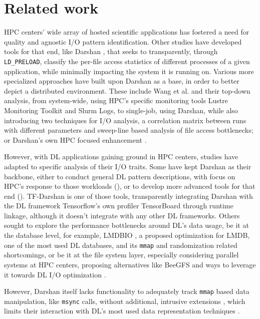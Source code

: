 \documentclass[conference]{IEEEtran}
\begin{document}
\section{Related work}


HPC centers' wide array of hosted scientific applications has fostered a need for quality and agnostic I/O pattern identification. Other studies have developed tools for that end, like Darshan \cite{HPCIO24/7}, that seeks to transparently, through \texttt{LD\_PRELOAD}, classify the per-file access statistics of different processes of a given application, while minimally impacting the system it is running on. Various more specialized approaches have built upon Darshan as a base, in order to better depict a distributed environment. These include Wang et al. \cite{zoomin} and their top-down analysis, from system-wide, using HPC's specific monitoring tools Lustre Monitoring Toolkit and Slurm Logs, to single-job, using Darshan, while also introducing two techniques for I/O analysis, a correlation matrix between runs with different parameters and sweep-line based analysis of file access bottlenecks; or Darshan's own HPC focused enhancement \cite{HPCIODarshan}. 

However, with DL applications gaining ground in HPC centers, studies have adapted to specific analysis of their I/O traits. Some have kept Darshan as their backbone, either to conduct general DL pattern descriptions, with focus on HPC's response to those workloads (\cite{IOHPCDLBOOK,CharacterizationMLIOLeadHPC, UnderstandingDLIOHPC}), or to develop more advanced tools for that end (\cite{DFTracerAIHPC}). TF-Darshan \cite{tfdarshan} is one of those tools, transparently integrating Darshan with the DL framework Tensorflow's own profiler TensorBoard through runtime linkage, although it doesn't integrate with any other DL frameworks. Others sought to explore the performance bottlenecks around DL's data usage, be it at the database level, for example, LMDBIO \cite{LMDB}, a proposed optimization for LMDB, one of the most used DL databases, and its \texttt{mmap} and randomization related shortcomings, or be it at the file system layer, especially considering parallel systems at HPC centers, proposing alternatives like BeeGFS \cite{beegfs} and ways to leverage it towards DL I/O optimization \cite{beegfsDL}.

However, Darshan itself lacks functionality to adequately track \texttt{mmap} based data manipulation, like \texttt{msync} calls, without additional, intrusive extensions \cite{tfdarshan}, which limits their interaction with DL's most used data representation techniques \cite{LMDB}.
\end{document}
